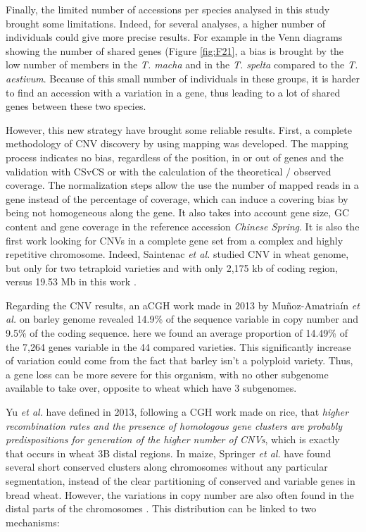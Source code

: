 \documentclass[a4paper, 12pt]{article}
\begin{document}
\begin{onehalfspace}
Finally, the limited number of accessions per species analysed in this study brought some limitations. Indeed, for several analyses, a higher number of individuals could give more precise results. For example in the Venn diagrams showing the number of shared genes (Figure \ref{fig:F21}, a bias is brought by the low number of members in the \textit{T. macha} and in the \textit{T. spelta} compared to the \textit{T. aestivum}. Because of this small number of individuals in these groups, it is harder to find an accession with a variation in a gene, thus leading to a lot of shared genes between these two species. 

\vspace{0.5cm}

However, this new strategy have brought some reliable results. First, a complete methodology of CNV discovery by using mapping was developed. The mapping process indicates no bias, regardless of the position, in or out of genes and the validation with CSvCS or with the calculation of the theoretical / observed coverage. The normalization steps allow the use the number of mapped reads in a gene instead of the percentage of coverage, which can induce a covering bias by being not homogeneous along the gene. It also takes into account gene size, GC content and gene coverage in the reference accession \textit{Chinese Spring}. It is also the first work looking for CNVs in a complete gene set from a complex and highly repetitive chromosome. Indeed, Saintenac \textit{et al.} studied CNV in wheat genome, but only for two tetraploid varieties and with only 2,175 kb of coding region, versus 19.53 Mb in this work \citep{Saintenac2011}. 

Regarding the CNV results, an aCGH work made in 2013 by Muñoz-Amatriaín \textit{et al.} on barley genome revealed 14.9\% of the sequence variable in copy number and 9.5\% of the coding sequence. here we found  an average proportion of 14.49\% of the 7,264 genes variable in the 44 compared varieties. This significantly increase of variation could come from the fact that barley isn't a polyploid variety. Thus, a gene loss can be more severe for this organism, with no other subgenome available to take over, opposite to wheat which have 3 subgenomes.

Yu \textit{et al.} have defined in 2013, following a CGH work made on rice, that \textit{higher recombination rates and the presence of homologous gene clusters are probably predispositions for generation of the higher number of CNVs}, which is exactly that occurs in wheat 3B distal regions. In maize, Springer \textit{et al.} have found several short conserved clusters along chromosomes without any particular segmentation, instead of the clear partitioning of conserved and variable genes in bread wheat. However, the variations in copy number are also often found in the distal parts of the chromosomes \citep{Springer2009}. This distribution can be linked to two mechanisms:


\end{onehalfspace}
\end{document}
